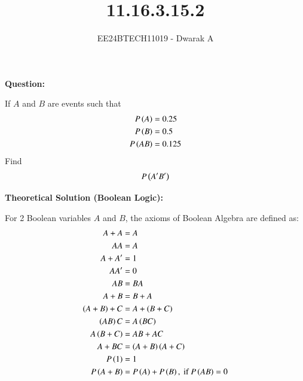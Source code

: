 \documentclass[journal]{IEEEtran}
\begin{document}

\vspace{3cm}

\title{11.16.3.15.2}
\author{EE24BTECH11019 - Dwarak A}
{\let\newpage\relax\maketitle}

\renewcommand{\thefigure}{\theenumi}
\renewcommand{\thetable}{\theenumi}
\setlength{\intextsep}{10pt} %


\renewcommand{\thetable}{\theenumi}

\textbf{Question:}

If $A$ and $B$ are events such that
\begin{align}
    P\left(A\right) &= 0.25 \\
    P\left(B\right) &= 0.5 \\
    P\left(AB\right) &= 0.125
\end{align}
Find
\begin{align}
    P\left(A^\prime B^\prime \right)
\end{align}

\solution

\textbf{Theoretical Solution (Boolean Logic):}

For 2 Boolean variables $A$ and $B$, the axioms of Boolean Algebra are defined as:
\begin{align}
    A + A &= A\\
    AA &= A \\
    A + A^\prime  &= 1\\
    AA^\prime  &= 0 \\
    AB &= BA\\
    A + B &= B + A\\
    \left(A + B\right) + C &= A + \left(B + C\right) \\
    \left(AB\right)C &= A\left(BC\right) \\
    A\left(B + C\right) &= AB + AC \\
    A + BC &= \left(A + B\right)\left(A + C\right) \\
    P\left(1\right) &= 1\\
    P\left(A + B\right) &= P\left(A\right) + P\left(B\right), \text{ if } P\left(AB\right) = 0
\end{align}
\end{document}
